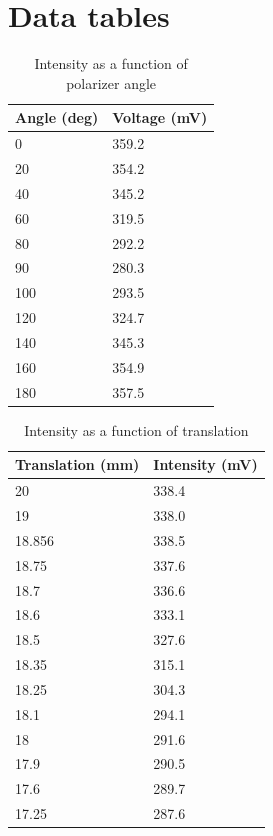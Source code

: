 \documentclass[notitlepage]{report}
\begin{document}
	\pagebreak
	\section*{Data tables}
	\begin{table}[H]
		\centering
		\caption{Intensity as a function of polarizer angle}
		\begin{tabular}{@{}ll@{}}
			\toprule
			Angle (deg) & Voltage (mV) \\ \midrule
			0           & 359.2        \\
			20          & 354.2        \\
			40          & 345.2        \\
			60          & 319.5        \\
			80          & 292.2        \\
			90          & 280.3        \\
			100         & 293.5        \\
			120         & 324.7        \\
			140         & 345.3        \\
			160         & 354.9        \\
			180         & 357.5        \\ \bottomrule
		\end{tabular}
	\end{table}

\begin{table}[H]
	\centering
	\caption{Intensity as a function of translation}
	\begin{tabular}{@{}ll@{}}
		\toprule
		Translation (mm) & Intensity (mV) \\
		\midrule
		20               & 338.4          \\
		19               & 338.0          \\
		18.856           & 338.5          \\
		18.75            & 337.6          \\
		18.7             & 336.6          \\
		18.6             & 333.1          \\
		18.5             & 327.6          \\
		18.35            & 315.1          \\
		18.25            & 304.3          \\
		18.1             & 294.1          \\
		18               & 291.6          \\
		17.9             & 290.5          \\
		17.6             & 289.7          \\
		17.25            & 287.6      \\ \bottomrule   
	\end{tabular}
\end{table}
\end{document}
